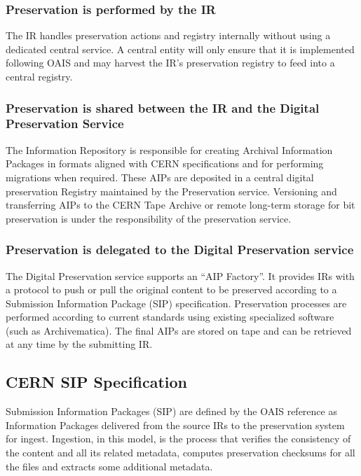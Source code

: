\documentclass[11pt]{IEEEtran}
\begin{document}
\subsubsection{Preservation is performed by the IR} The IR handles preservation actions and registry internally without using a dedicated central service. A central entity will only ensure that it is implemented following OAIS and may harvest the IR's preservation registry to feed into a central registry.

\subsubsection{Preservation is shared between the IR and the Digital Preservation Service}

The Information Repository is responsible for creating Archival Information Packages in formats aligned with CERN specifications and for performing migrations when required. These AIPs are deposited in a central digital preservation Registry maintained by the Preservation service. Versioning and transferring AIPs to the CERN Tape Archive or remote long-term storage for bit preservation is under the responsibility of the preservation service.

\subsubsection{Preservation is delegated to the Digital Preservation service}

The Digital Preservation service supports an “AIP Factory”. It provides IRs with a protocol to push or pull the original content to be preserved according to a Submission Information Package (SIP) specification. Preservation processes are performed according to current standards using existing specialized software (such as Archivematica). The final AIPs are stored on tape and can be retrieved at any time by the submitting IR.

\subsection{CERN SIP Specification}

Submission Information Packages (SIP) are defined by the OAIS reference as Information Packages  delivered from the source IRs to the preservation system for ingest. Ingestion, in this model, is the process that verifies the consistency of the content and all its related metadata, computes preservation checksums for all the files and extracts some additional metadata.
\end{document}
